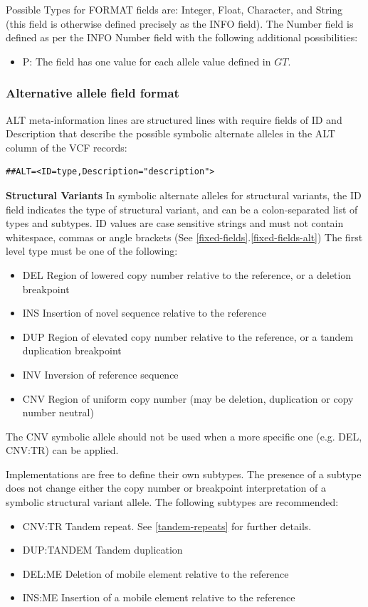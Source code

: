 \documentclass[8pt]{article}
\begin{document}
Possible Types for FORMAT fields are: Integer, Float, Character, and String (this field is otherwise defined precisely as the INFO field).
The Number field is defined as per the INFO Number field with the following additional possibilities:

\begin{itemize}
	\item P: The field has one value for each allele value defined in $GT$.
\end{itemize}

\subsubsection{Alternative allele field format} \label{altfield}
ALT meta-information lines are structured lines with require fields of ID and Description that describe the possible symbolic alternate alleles in the ALT column of the VCF records:

\begin{verbatim}
##ALT=<ID=type,Description="description">
\end{verbatim}

\noindent \textbf{Structural Variants} \newline
In symbolic alternate alleles for structural variants, the ID field indicates the type of structural variant, and can be a colon-separated list of types and subtypes.
ID values are case sensitive strings and must not contain whitespace, commas or angle brackets (See \ref{fixed-fields}.\ref{fixed-fields-alt})
The first level type must be one of the following:
\begin{itemize}
  \item DEL Region of lowered copy number relative to the reference, or a deletion breakpoint
  \item INS Insertion of novel sequence relative to the reference
  \item DUP Region of elevated copy number relative to the reference, or a tandem duplication breakpoint
  \item INV Inversion of reference sequence
  \item CNV Region of uniform copy number (may be deletion, duplication or copy number neutral)
\end{itemize}

The CNV symbolic allele should not be used when a more specific one (e.g. DEL, CNV:TR) can be applied.

Implementations are free to define their own subtypes.
The presence of a subtype does not change either the copy number or breakpoint interpretation of a symbolic structural variant allele.
The following subtypes are recommended:
\begin{itemize}
  \item CNV:TR Tandem repeat. See \ref{tandem-repeats} for further details.
  \item DUP:TANDEM Tandem duplication
  \item DEL:ME Deletion of mobile element relative to the reference
  \item INS:ME Insertion of a mobile element relative to the reference
\end{itemize}
\end{document}
